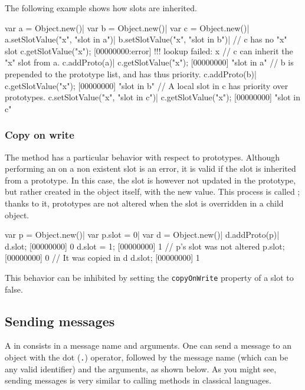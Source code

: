 The following example shows how slots are inherited.

\begin{urbiscript}[firstnumber=1]
var a = Object.new()|
var b = Object.new()|
var c = Object.new()|
a.setSlotValue("x", "slot in a")|
b.setSlotValue("x", "slot in b")|
// c has no "x" slot
c.getSlotValue("x");
[00000000:error] !!! lookup failed: x
// c can inherit the "x" slot from a.
c.addProto(a)|
c.getSlotValue("x");
[00000000] "slot in a"
// b is prepended to the prototype list, and has thus priority.
c.addProto(b)|
c.getSlotValue("x");
[00000000] "slot in b"
// A local slot in c has priority over prototypes.
c.setSlotValue("x", "slot in c")|
c.getSlotValue("x");
[00000000] "slot in c"
\end{urbiscript}

\subsubsection{Copy on write}
\label{sec:lang:cow}
The  method has a particular behavior with
respect to prototypes. Although performing an 
on a non existent slot is an error, it is valid if the slot is inherited
from a prototype. In this case, the slot is however not updated in the
prototype, but rather created in the object itself, with the new value. This
process is called ; thanks to it, prototypes are not
altered when the slot is overridden in a child object.

\begin{urbiscript}
var p = Object.new()|
var p.slot = 0|
var d = Object.new()|
d.addProto(p)|
d.slot;
[00000000] 0
d.slot = 1;
[00000000] 1
// p's slot was not altered
p.slot;
[00000000] 0
// It was copied in d
d.slot;
[00000000] 1
\end{urbiscript}

This behavior can be inhibited by setting the \lstinline|copyOnWrite| property
of a slot to false.


\subsection{Sending messages}

A  in \us consists in a message name and arguments. One can
send a message to an object with the dot (\lstinline|.|) operator, followed
by the message name (which can be any valid identifier) and the arguments,
as shown below. As you might see, sending messages is very similar to calling
methods in classical languages.

